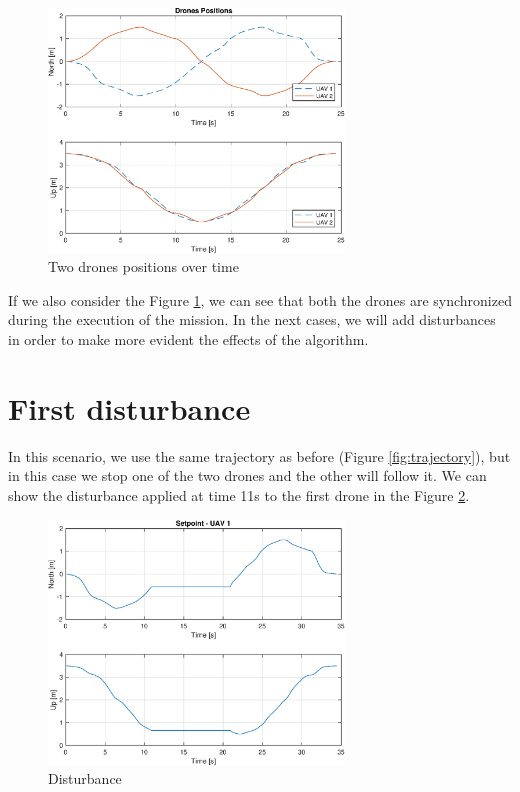 \begin{figure}
\centering
\includegraphics[width=0.7\textwidth]{chapters/chapter-04/figures/overlapped.eps}
\caption{Two drones positions over time}
\label{fig:overlapped}
\end{figure}

If we also consider the Figure \ref{fig:overlapped}, we can see that both the drones
are synchronized during the execution of the mission. In the next cases, we will
add disturbances in order to make more evident the effects of the algorithm.


\section{First disturbance}
In this scenario, we use the same trajectory as before (Figure \ref{fig:trajectory}),
but in this case we stop one of the two drones and the other will follow it.
We can show the disturbance applied at time 11s to the first drone in the Figure \ref{fig:disturbance}.

\begin{figure}
\centering
\includegraphics[width=0.7\textwidth]{chapters/chapter-04/figures/pos_1.eps}
\caption{Disturbance}
\label{fig:disturbance}
\end{figure}

